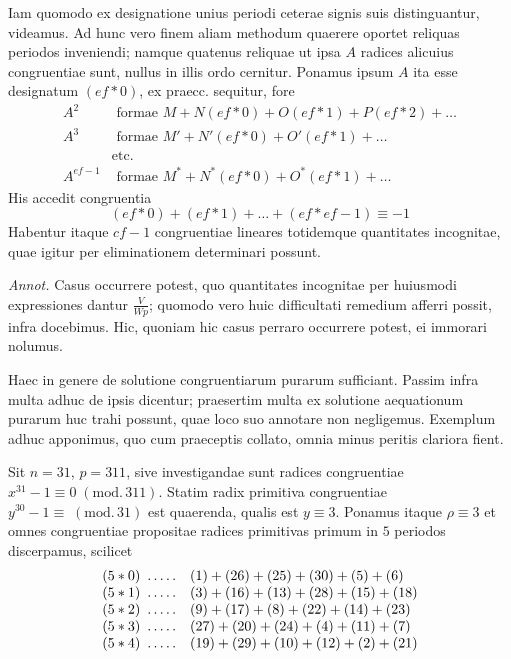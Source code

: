 Iam quomodo ex designatione unius periodi ceterae signis suis distinguantur, videamus. Ad hunc vero finem aliam methodum quaerere oportet reliquas periodos inveniendi; namque quatenus reliquae ut ipsa $A$ radices alicuius congruentiae sunt, nullus in illis ordo cernitur. Ponamus ipsum $A$ ita esse designatum $(ef\ast0)$, ex praecc. sequitur, fore
\[
\begin{aligned}
A^2&\text{ formae }M+N(ef\ast0)+O(ef\ast1)+P(ef\ast2)+\ldots\\
A^3&\text{ formae }M'+N'(ef\ast0)+O'(ef\ast1)+\ldots\\
&\text{etc.}\\
A^{ef-1}&\text{ formae }M^\ast+N^\ast(ef\ast0)+O^\ast(ef\ast1)+\ldots
\end{aligned}
\]
His accedit congruentia
\[
(ef\ast0)+(ef\ast1)+\ldots+(ef\ast ef-1)\equiv-1
\]
Habentur itaque $cf-1$ congruentiae lineares totidemque quantitates incognitae, quae igitur per eliminationem determinari possunt.

\emph{Annot.} Casus occurrere potest, quo quantitates incognitae per huiusmodi expressiones dantur $\frac{V}{Wp}$; quomodo vero huic difficultati remedium afferri possit, infra docebimus. Hic, quoniam hic casus perraro occurrere potest, ei immorari nolumus.

Haec in genere de solutione congruentiarum purarum sufficiant. Passim infra multa adhuc de ipsis dicentur; praesertim multa ex solutione aequationum purarum huc trahi possunt, quae loco suo annotare non negligemus. Exemplum adhuc apponimus, quo cum praeceptis collato, omnia minus peritis clariora fient.

Sit $n=31$, $p=311$, sive investigandae sunt radices congruentiae $x^{31}-1\equiv0\;(\mathrm{mod.}\,311)$. Statim radix primitiva congruentiae $y^{30}-1\equiv\;(\mathrm{mod.}\,31)$ est quaerenda, qualis est $y\equiv3$. Ponamus itaque $\rho\equiv3$ et omnes congruentiae propositae radices primitivas primum in $5$ periodos discerpamus, scilicet
%
\[
\begin{array}{rl}
(5\ast0)\ \mathinner{.\,.\,.\,.\,.}&(1)+(26)+(25)+(30)+(5)+(6)\\
(5\ast1)\ \mathinner{.\,.\,.\,.\,.}&(3)+(16)+(13)+(28)+(15)+(18)\\
(5\ast2)\ \mathinner{.\,.\,.\,.\,.}&(9)+(17)+(8)+(22)+(14)+(23)\\
(5\ast3)\ \mathinner{.\,.\,.\,.\,.}&(27)+(20)+(24)+(4)+(11)+(7)\\
(5\ast4)\ \mathinner{.\,.\,.\,.\,.}&(19)+(29)+(10)+(12)+(2)+(21)
\end{array}
\]

